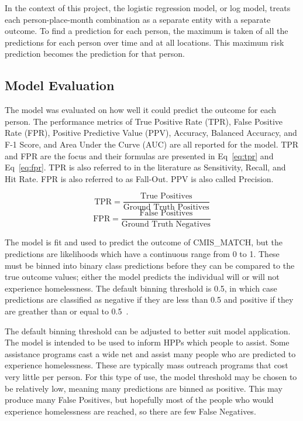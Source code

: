 \documentclass[10pt,letterpaper]{article}
\begin{document}
In the context of this project, the logistic regression model, or log model, treats each person-place-month combination as a separate entity with a separate outcome. To find a prediction for each person, the maximum is taken of all the predictions for each person over time and at all locations. This maximum risk prediction becomes the prediction for that person.

\subsection*{Model Evaluation}
The model was evaluated on how well it could predict the outcome for each person. The performance metrics of True Positive Rate (TPR), False Positive Rate (FPR), Positive Predictive Value (PPV), Accuracy, Balanced Accuracy, and F-1 Score, and Area Under the Curve (AUC) are all reported for the model. TPR and FPR are the focus and their formulas are presented in Eq~\ref{eq:tpr} and Eq~\ref{eq:fpr}. TPR is also referred to in the literature as Sensitivity, Recall, and Hit Rate. FPR is also referred to as Fall-Out. PPV is also called Precision. 

\begin{multicols}{2}
    \begin{equation}
        \text{TPR} = \frac{\text{True Positives}}{\text{Ground Truth Positives}}
        \label{eq:tpr}
    \end{equation}\break
    \begin{equation}
        \text{FPR} = \frac{\text{False Positives}}{\text{Ground Truth Negatives}}
        \label{eq:fpr}
    \end{equation}
\end{multicols}

The model is fit and used to predict the outcome of CMIS\_MATCH, but the predictions are likelihoods which have a continuous range from 0 to 1. These must be binned into binary class predictions before they can be compared to the true outcome values; either the model predicts the individual will or will not experience homelessness. The default binning threshold is 0.5, in which case predictions are classified as negative if they are less than 0.5 and positive if they are greather than or equal to 0.5~\cite{bewick2005statistics}. 

The default binning threshold can be adjusted to better suit model application. The model is intended to be used to inform HPPs which people to assist. Some assistance programs cast a wide net and assist many people who are predicted to experience homelessness. These are typically mass outreach programs that cost very little per person. For this type of use, the model threshold may be chosen to be relatively low, meaning many predictions are binned as positive. This may produce many False Positives, but hopefully most of the people who would experience homelessness are reached, so there are few False Negatives. 
\end{document}

